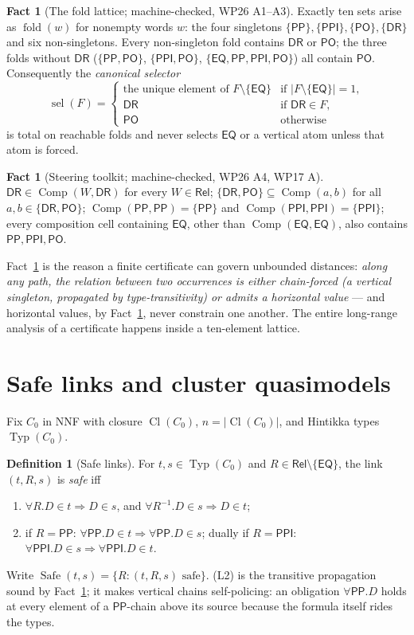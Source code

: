 \documentclass[11pt]{article}
\theoremstyle{definition}
\newtheorem{definition}[theorem]{Definition}
\newtheorem{fact}[theorem]{Fact}
\newcommand{\EQ}{\mathsf{EQ}}
\newcommand{\PP}{\mathsf{PP}}
\newcommand{\PPI}{\mathsf{PPI}}
\newcommand{\PO}{\mathsf{PO}}
\newcommand{\DR}{\mathsf{DR}}
\newcommand{\Rel}{\mathsf{Rel}}
\newcommand{\Comp}{\operatorname{Comp}}
\newcommand{\fold}{\operatorname{fold}}
\newcommand{\sel}{\operatorname{sel}}
\newcommand{\Cl}{\operatorname{Cl}}
\newcommand{\Typ}{\operatorname{Typ}}
\newcommand{\Safe}{\operatorname{Safe}}
\begin{document}
\begin{fact}[The fold lattice; machine-checked, WP26 A1--A3]
\label{fact:fold}
Exactly ten sets arise as $\fold(w)$ for nonempty words $w$:
the four singletons $\{\PP\},\{\PPI\},\{\PO\},\{\DR\}$ and six
non-singletons.  Every non-singleton fold contains $\DR$ or $\PO$;
the three folds without $\DR$
($\{\PP,\PO\}$, $\{\PPI,\PO\}$, $\{\EQ,\PP,\PPI,\PO\}$) all contain
$\PO$.  Consequently the \emph{canonical selector}
\[
\sel(F)=
\begin{cases}
\text{the unique element of } F\setminus\{\EQ\} & \text{if } |F\setminus\{\EQ\}|=1,\\
\DR & \text{if }\DR\in F,\\
\PO & \text{otherwise}
\end{cases}
\]
is total on reachable folds and never selects $\EQ$ or a vertical atom
unless that atom is forced.
\end{fact}

\begin{fact}[Steering toolkit; machine-checked, WP26 A4, WP17 A]
\label{fact:toolkit}
$\DR\in\Comp(W,\DR)$ for every $W\in\Rel$;
$\{\DR,\PO\}\subseteq\Comp(a,b)$ for all $a,b\in\{\DR,\PO\}$;
$\Comp(\PP,\PP)=\{\PP\}$ and $\Comp(\PPI,\PPI)=\{\PPI\}$;
every composition cell containing $\EQ$, other than
$\Comp(\EQ,\EQ)$, also contains $\PP,\PPI,\PO$.
\end{fact}

Fact~\ref{fact:fold} is the reason a finite certificate can govern
unbounded distances: \emph{along any path, the relation between two
occurrences is either chain-forced (a vertical singleton, propagated by
type-transitivity) or admits a horizontal value} --- and horizontal
values, by Fact~\ref{fact:toolkit}, never constrain one another.  The
entire long-range analysis of a certificate happens inside a ten-element
lattice.

\section{Safe links and cluster quasimodels}\label{sec:cq}

Fix $C_0$ in NNF with closure $\Cl(C_0)$, $n=|\Cl(C_0)|$, and Hintikka
types $\Typ(C_0)$.

\begin{definition}[Safe links]\label{def:safe}
For $t,s\in\Typ(C_0)$ and $R\in\Rel\setminus\{\EQ\}$, the link
$(t,R,s)$ is \emph{safe} iff
\begin{enumerate}[label=(L\arabic*),leftmargin=2.6em]
\item $\forall R.D\in t\Rightarrow D\in s$, and
$\forall R^{-1}.D\in s\Rightarrow D\in t$;
\item if $R=\PP$: $\forall\PP.D\in t\Rightarrow\forall\PP.D\in s$;
dually if $R=\PPI$: $\forall\PPI.D\in s\Rightarrow\forall\PPI.D\in t$.
\end{enumerate}
Write $\Safe(t,s)=\{R:(t,R,s)\text{ safe}\}$.  (L2) is the transitive
propagation sound by Fact~\ref{fact:toolkit}; it makes vertical chains
self-policing: an obligation $\forall\PP.D$ holds at every element of a
$\PP$-chain above its source because the formula itself rides the
types.
\end{definition}
\end{document}
